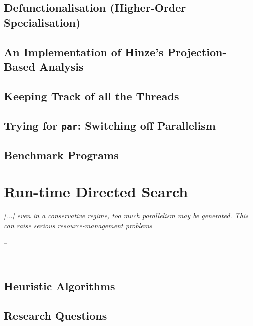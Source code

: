\documentclass[openright, dottedtoc, headinclude, footinclude=true, a4paper, numbers=noenddot]{scrreprt}
\makeatletter
\newenvironment{chapquote}[2][2em]
  {\setlength{\@tempdima}{#1}%
   \def\chapquote@author{#2}%
   \parshape 1 \@tempdima \dimexpr\textwidth-2\@tempdima\relax%
   \itshape}
  {\par\normalfont\hfill--\ \chapquote@author\hspace*{\@tempdima}\par\noindent\hrulefill\\[1cm]}
\makeatother
\begin{document}
        \section{Defunctionalisation (Higher-Order Specialisation)}
        \label{sec:defunctionalisation}
        
    
        \section{An Implementation of Hinze's Projection-Based Analysis}
        \label{sec:hinzeImplementation}
        
        \section{Keeping Track of all the Threads}
        \label{sec:logging}
        
    
        \section{Trying for \texttt{par}: Switching off Parallelism}
        \label{sec:parSwitching}
        

        \section{Benchmark Programs}
        \label{sec:benchmarks}
        
    
    \chapter{Run-time Directed Search}
    \label{chap:blind}
    \begin{chapquote}{\cite{peyton1987implementation}}
    [...] even in a conservative regime, too much parallelism may be generated.
    This can raise serious resource-management problems
    \end{chapquote}
    
    
        \section{Heuristic Algorithms}
        \label{sec:blind-ParFunc}
        

        \section{Research Questions}
        \label{sec:hypotheses}
        
    
\end{document}

